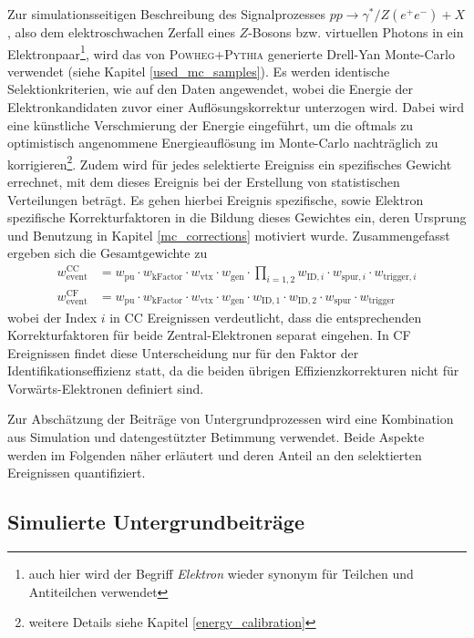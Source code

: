 Zur simulationsseitigen Beschreibung des Signalprozesses
$pp \rightarrow \gamma^*/Z(e^+e^-) + X$, also dem elektroschwachen Zerfall
eines $Z$-Bosons bzw. virtuellen Photons in ein Elektronpaar\footnote{auch hier
wird der Begriff \textit{Elektron} wieder synonym für Teilchen und Antiteilchen
verwendet}, wird das von \textsc{Powheg+Pythia} generierte Drell-Yan
Monte-Carlo verwendet (siehe Kapitel \ref{used_mc_samples}). Es werden
identische Selektionkriterien, wie auf den Daten angewendet, wobei die Energie
der Elektronkandidaten zuvor einer Auflösungskorrektur unterzogen wird. Dabei
wird eine künstliche Verschmierung der Energie eingeführt, um die oftmals zu
optimistisch angenommene Energieauflösung im Monte-Carlo nachträglich zu
korrigieren\footnote{weitere Details siehe Kapitel \ref{energy_calibration}}.
Zudem wird für jedes selektierte Ereigniss ein spezifisches Gewicht errechnet,
mit dem dieses Ereignis bei der Erstellung von statistischen Verteilungen
beträgt. Es gehen hierbei Ereignis spezifische, sowie Elektron spezifische
Korrekturfaktoren in die Bildung dieses Gewichtes ein, deren Ursprung und
Benutzung in Kapitel \ref{mc_corrections} motiviert wurde. Zusammengefasst
ergeben sich die Gesamtgewichte zu
\begin{align}
    w_\text{event}^\text{CC} &= w_\text{pu} \cdot w_\text{kFactor} \cdot
        w_\text{vtx} \cdot w_\text{gen} \cdot \prod_{i=1,2} w_{\text{ID},i}
        \cdot w_{\text{spur},i} \cdot w_{\text{trigger},i}
        \\[2pt]
    w_\text{event}^\text{CF} &= w_\text{pu} \cdot w_\text{kFactor} \cdot
        w_\text{vtx} \cdot w_\text{gen} \cdot w_{\text{ID},1} \cdot
        w_{\text{ID},2} \cdot w_{\text{spur}} \cdot w_{\text{trigger}}
\end{align}
wobei der Index $i$ in \ac{CC} Ereignissen verdeutlicht, dass die
entsprechenden Korrekturfaktoren für beide Zentral-Elektronen separat eingehen.
In \ac{CF} Ereignissen findet diese Unterscheidung nur für den Faktor der
Identifikationseffizienz statt, da die beiden übrigen Effizienzkorrekturen
nicht für Vorwärts-Elektronen definiert sind.

Zur Abschätzung der Beiträge von Untergrundprozessen wird eine Kombination aus
Simulation und datengestützter Betimmung verwendet. Beide Aspekte werden im
Folgenden näher erläutert und deren Anteil an den selektierten Ereignissen
quantifiziert.



\subsection{Simulierte Untergrundbeiträge}
\label{afb:monte_carlos}

